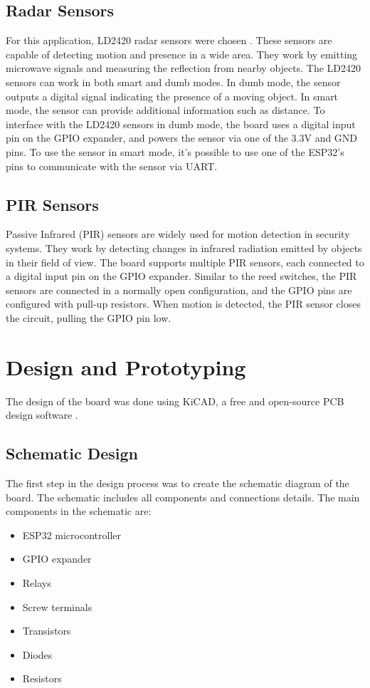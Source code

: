 \documentclass[a4paper,12pt]{article}
\begin{document}
\subsection{Radar Sensors}
For this application, LD2420 radar sensors were chosen \cite{HLKLD242024GhzHumana}. These sensors are capable of detecting motion and presence in a wide area. They work by emitting microwave signals and measuring the reflection from nearby objects. The LD2420 sensors can work in both smart and dumb modes. In dumb mode, the sensor outputs a digital signal indicating the presence of a moving object. In smart mode, the sensor can provide additional information such as distance. To interface with the LD2420 sensors in dumb mode, the board uses a digital input pin on the GPIO expander, and powers the sensor via one of the 3.3V and GND pins.
To use the sensor in smart mode, it's possible to use one of the ESP32's pins to communicate with the sensor via UART. 

\subsection{PIR Sensors}
Passive Infrared (PIR) sensors are widely used for motion detection in security systems. They work by detecting changes in infrared radiation emitted by objects in their field of view. The board supports multiple PIR sensors, each connected to a digital input pin on the GPIO expander. Similar to the reed switches, the PIR sensors are connected in a normally open configuration, and the GPIO pins are configured with pull-up resistors. When motion is detected, the PIR sensor closes the circuit, pulling the GPIO pin low.

\newpage
\section{Design and Prototyping}
The design of the board was done using KiCAD, a free and open-source PCB design software \cite{KiCadEDA}.

\subsection{Schematic Design}
The first step in the design process was to create the schematic diagram of the board. The schematic includes all components and connections details. The main components in the schematic are:
\begin{itemize}
    \item ESP32 microcontroller
    \item GPIO expander
    \item Relays
    \item Screw terminals
    \item Transistors
    \item Diodes
    \item Resistors
\end{itemize}
\end{document}
